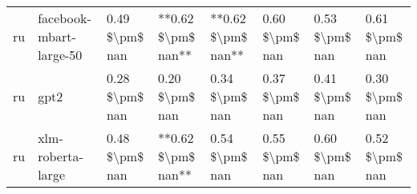 \begin{tabular}{llllllll}
      ru &            facebook-mbart-large-50 & 0.49 \$\textbackslash pm\$ nan &        **0.62 \$\textbackslash pm\$ nan** &    **0.62 \$\textbackslash pm\$ nan** &         0.60 \$\textbackslash pm\$ nan &                          0.53 \$\textbackslash pm\$ nan &     0.61 \$\textbackslash pm\$ nan \\
      ru &                               gpt2 & 0.28 \$\textbackslash pm\$ nan &            0.20 \$\textbackslash pm\$ nan &        0.34 \$\textbackslash pm\$ nan &         0.37 \$\textbackslash pm\$ nan &                          0.41 \$\textbackslash pm\$ nan &     0.30 \$\textbackslash pm\$ nan \\
      ru &                  xlm-roberta-large & 0.48 \$\textbackslash pm\$ nan &        **0.62 \$\textbackslash pm\$ nan** &        0.54 \$\textbackslash pm\$ nan &         0.55 \$\textbackslash pm\$ nan &                          0.60 \$\textbackslash pm\$ nan &     0.52 \$\textbackslash pm\$ nan \\
\bottomrule
\end{tabular}
